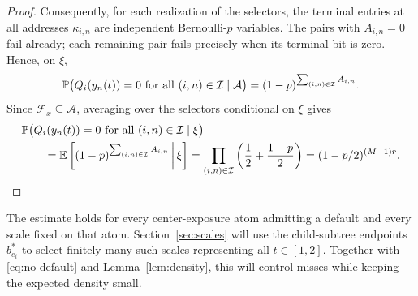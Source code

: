 \begin{proof}
Consequently, for each realization of the selectors, the terminal
entries at all addresses \(\kappa_{i,n}\) are independent
Bernoulli-\(p\) variables. The pairs with \(A_{i,n}=0\) fail already;
each remaining pair fails precisely when its terminal bit is zero.
Hence, on \(\xi\),
\[
 \mathbb P\bigl(Q_i(y_n(t))=0\text{ for all }(i,n)\in\mathcal I
       \mid\mathcal A\bigr)
 =(1-p)^{\sum_{(i,n)\in\mathcal I}A_{i,n}}.
\]
Since \(\mathcal F_x\subseteq\mathcal A\), averaging over the
selectors conditional on \(\xi\) gives
\begin{align*}
 &\mathbb P\bigl(Q_i(y_n(t))=0\text{ for all }(i,n)\in\mathcal I
       \mid\xi\bigr)\\
 &\qquad=\mathbb E\left[(1-p)^{\sum_{(i,n)\in\mathcal I}A_{i,n}}
       \,\middle|\,\xi\right]
 =\prod_{(i,n)\in\mathcal I}\left(\frac12+\frac{1-p}{2}\right)
 =(1-p/2)^{(M-1)r}.
\end{align*}
\end{proof}

The estimate holds for every center-exposure atom admitting a default
and every scale fixed on that atom. Section~\ref{sec:scales} will use
the child-subtree endpoints \(b_{e_i}^*\) to select finitely many such
scales representing all \(t\in[1,2]\). Together with
\eqref{eq:no-default} and Lemma~\ref{lem:density}, this will control
misses while keeping the expected density small.
